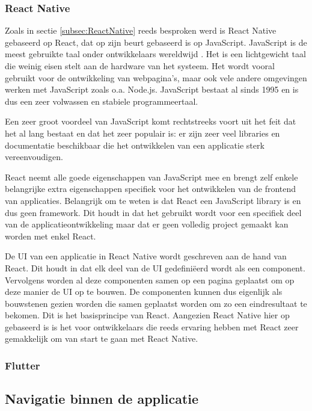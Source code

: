 \subsubsection{React Native}
\label{subsubsec:taalReactNative}

Zoals in sectie \ref{subsec:ReactNative} reeds besproken werd is React Native gebaseerd op React, dat op zijn beurt gebaseerd is op JavaScript. JavaScript is de meest gebruikte taal onder ontwikkelaars wereldwijd \autocite{Liu2020a}. Het is een lichtgewicht taal die weinig eisen stelt aan de hardware van het systeem. Het wordt vooral gebruikt voor de ontwikkeling van webpagina's, maar ook vele andere omgevingen werken met JavaScript zoals o.a. Node.js. JavaScript bestaat al sinds 1995 en is dus een zeer volwassen en stabiele programmeertaal.

Een zeer groot voordeel van JavaScript komt rechtstreeks voort uit het feit dat het al lang bestaat en dat het zeer populair is: er zijn zeer veel libraries en documentatie beschikbaar die het ontwikkelen van een applicatie sterk vereenvoudigen.

React neemt alle goede eigenschappen van JavaScript mee en brengt zelf enkele belangrijke extra eigenschappen specifiek voor het ontwikkelen van de frontend van applicaties. Belangrijk om te weten is dat React een JavaScript library is en dus geen framework. Dit houdt in dat het gebruikt wordt voor een specifiek deel van de applicatieontwikkeling maar dat er geen volledig project gemaakt kan worden met enkel React.

De UI van een applicatie in React Native wordt geschreven aan de hand van React. Dit houdt in dat elk deel van de UI gedefiniëerd wordt als een component. Vervolgens worden al deze componenten samen op een pagina geplaatst om op deze manier de UI op te bouwen. De componenten kunnen dus eigenlijk als bouwstenen gezien worden die samen geplaatst worden om zo een eindresultaat te bekomen. Dit is het basisprincipe van React. Aangezien React Native hier op gebaseerd is is het voor ontwikkelaars die reeds ervaring hebben met React zeer gemakkelijk om van start te gaan met React Native.

\subsubsection{Flutter}
\label{subsubsec:taalFlutter}



\subsection{Navigatie binnen de applicatie}
\label{subsec:navigatieApplicatie}

